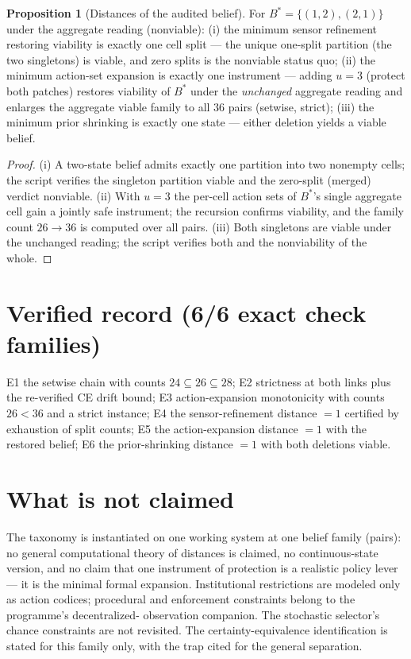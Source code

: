 \documentclass[10pt,twocolumn]{article}
\theoremstyle{definition}
\newtheorem{proposition}{Proposition}
\begin{document}
\begin{proposition}[Distances of the audited belief]
\label{prop:dist}
For $B^\ast=\{(1,2),(2,1)\}$ under the aggregate reading (nonviable):
(i) the minimum sensor refinement restoring viability is exactly one cell
split --- the unique one-split partition (the two singletons) is viable,
and zero splits is the nonviable status quo; (ii) the minimum action-set
expansion is exactly one instrument --- adding $u=3$ (protect both patches)
restores viability of $B^\ast$ under the \emph{unchanged} aggregate
reading and enlarges the aggregate viable family to all $36$ pairs
(setwise, strict); (iii) the minimum prior shrinking is exactly one state
--- either deletion yields a viable belief.
\end{proposition}
\begin{proof}
(i) A two-state belief admits exactly one partition into two nonempty
cells; the script verifies the singleton partition viable and the
zero-split (merged) verdict nonviable. (ii) With $u=3$ the per-cell
action sets of $B^\ast$'s single aggregate cell gain a jointly safe
instrument; the recursion confirms viability, and the family count
$26\to36$ is computed over all pairs. (iii) Both singletons are viable
under the unchanged reading; the script verifies both and the nonviability
of the whole.
\end{proof}

\section{Verified record (6/6 exact check families)}

E1 the setwise chain with counts $24\subseteq26\subseteq28$; E2 strictness
at both links plus the re-verified CE drift bound; E3 action-expansion
monotonicity with counts $26<36$ and a strict instance; E4 the
sensor-refinement distance $=1$ certified by exhaustion of split counts;
E5 the action-expansion distance $=1$ with the restored belief; E6 the
prior-shrinking distance $=1$ with both deletions viable.

\section{What is not claimed}

The taxonomy is instantiated on one working system at one belief family
(pairs): no general computational theory of distances is claimed, no
continuous-state version, and no claim that one instrument of protection
is a realistic policy lever --- it is the minimal formal expansion.
Institutional restrictions are modeled only as action codices; procedural
and enforcement constraints belong to the programme's decentralized-
observation companion. The stochastic selector's chance constraints are
not revisited. The certainty-equivalence identification is stated for this
family only, with the trap cited for the general separation.
\end{document}
